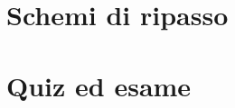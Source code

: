 \documentclass[11pt,a4paper]{report}
\begin{document}
\part{Schemi di ripasso}



\part{Quiz ed esame}




\appendix

\end{document}
